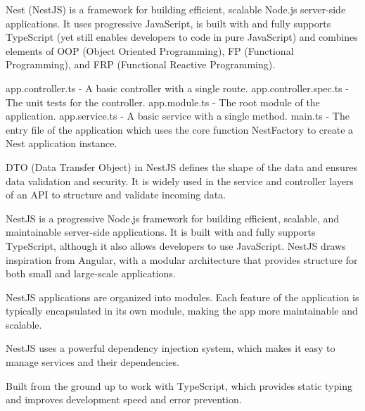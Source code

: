 
Nest (NestJS) is a framework for building efficient, scalable Node.js server-side applications. 
It uses progressive JavaScript, is built with and fully supports TypeScript (yet still enables developers to code in pure JavaScript) 
and combines elements of OOP (Object Oriented Programming), FP (Functional Programming), and FRP (Functional Reactive Programming).

app.controller.ts	- A basic controller with a single route.
app.controller.spec.ts	- The unit tests for the controller.
app.module.ts -	The root module of the application.
app.service.ts	- A basic service with a single method.
main.ts -	The entry file of the application which uses the core function NestFactory to create a Nest application instance.



DTO (Data Transfer Object) in NestJS defines the shape of the data and ensures data validation and security.
It is widely used in the service and controller layers of an API to structure and validate incoming data.



NestJS is a progressive Node.js framework for building efficient, scalable, and maintainable server-side applications.
It is built with and fully supports TypeScript, although it also allows developers to use JavaScript. 
NestJS draws inspiration from Angular, with a modular architecture that provides structure for both small and large-scale applications.



NestJS applications are organized into modules. Each feature of the application is typically encapsulated in its own module,
making the app more maintainable and scalable.


NestJS uses a powerful dependency injection system, which makes it easy to manage services and their dependencies.


Built from the ground up to work with TypeScript, which provides static typing and improves development speed and error prevention.

